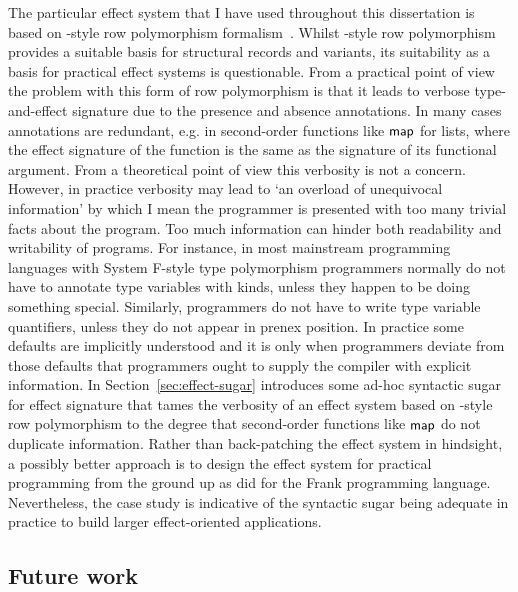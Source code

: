 \documentclass[12pt,phd,lfcs,twoside,openright,logo,leftchapter,normalheadings]{infthesis}
\theoremstyle{plain}
\theoremstyle{definition}
\begin{document}
The particular effect system that I have used throughout this
dissertation is based on \citeauthor{Remy93}-style row polymorphism
formalism~\cite{Remy93}. Whilst \citeauthor{Remy93}-style row
polymorphism provides a suitable basis for structural records and
variants, its suitability as a basis for practical effect systems is
questionable. From a practical point of view the problem with this
form of row polymorphism is that it leads to verbose type-and-effect
signature due to the presence and absence annotations. In many cases
annotations are redundant, e.g. in second-order functions like
$\mathsf{map}$ for lists, where the effect signature of the function is
the same as the signature of its functional argument. From a
theoretical point of view this verbosity is not a concern. However, in
practice verbosity may lead to `an overload of unequivocal
information' by which I mean the programmer is presented with too many
trivial facts about the program. Too much information can hinder both
readability and writability of programs. For instance, in most
mainstream programming languages with System F-style type polymorphism
programmers normally do not have to annotate type variables with
kinds, unless they happen to be doing something special. Similarly,
programmers do not have to write type variable quantifiers, unless
they do not appear in prenex position. In practice some defaults are
implicitly understood and it is only when programmers deviate from
those defaults that programmers ought to supply the compiler with
explicit information. In Section~\ref{sec:effect-sugar} introduces
some ad-hoc syntactic sugar for effect signature that tames the
verbosity of an effect system based on \citeauthor{Remy93}-style row
polymorphism to the degree that second-order functions like
$\mathsf{map}$ do not duplicate information. Rather than back-patching
the effect system in hindsight, a possibly better approach is to
design the effect system for practical programming from the ground up
as \citet{LindleyMM17} did for the Frank programming language.
%
Nevertheless, the \UNIX{} case study is indicative of the syntactic
sugar being adequate in practice to build larger effect-oriented
applications.

\subsection{Future work}
\end{document}
